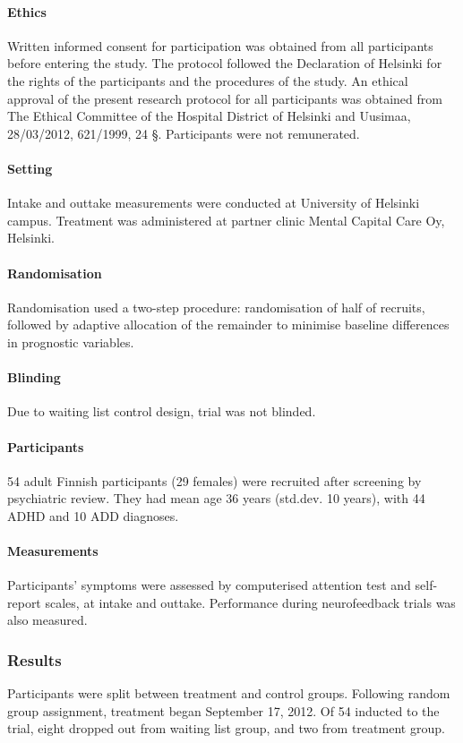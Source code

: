 \paragraph{Ethics}
Written informed consent for participation was obtained from all participants before entering the study. The protocol followed the Declaration of Helsinki for the rights of the participants and the procedures of the study. An ethical approval of the present research protocol for all participants was obtained from The Ethical Committee of the Hospital District of Helsinki and Uusimaa, 28/03/2012, 621/1999, 24 §. Participants were not remunerated.

\paragraph{Setting}
Intake and outtake measurements were conducted at University of Helsinki campus. Treatment was administered at partner clinic Mental Capital Care Oy, Helsinki.

\paragraph{Randomisation}
Randomisation used a two-step procedure: randomisation of half of recruits, followed by adaptive allocation of the remainder to minimise baseline differences in prognostic variables.

\paragraph{Blinding}
Due to waiting list control design, trial was not blinded.

\paragraph{Participants}
54 adult Finnish participants (29 females) were recruited after screening by psychiatric review. They had mean age 36 years (std.dev. 10 years), with 44 ADHD and 10 ADD diagnoses.

\paragraph{Measurements}
Participants’ symptoms were assessed by computerised attention test and self-report scales, at intake and outtake. Performance during neurofeedback trials was also measured.


\subsubsection{Results}
Participants were split between treatment and control groups. Following random group assignment, treatment began September 17, 2012. Of 54 inducted to the trial, eight dropped out from waiting list group, and two from treatment group.


